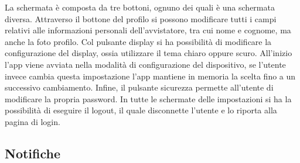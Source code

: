 \documentclass[a4paper,final,12pt]{report}
\begin{document}
La schermata è composta da tre bottoni, ognuno dei quali è una schermata diversa. Attraverso il bottone del profilo si possono modificare tutti i campi relativi alle informazioni personali dell'avvistatore, tra cui nome e cognome, ma anche la foto profilo. Col pulsante display si ha possibilità di modificare la configurazione del display, ossia utilizzare il tema chiaro oppure scuro. All'inizio l'app viene avviata nella modalità di configurazione del dispositivo, se l'utente invece cambia questa impostazione l'app mantiene in memoria la scelta fino a un successivo cambiamento. Infine, il pulsante sicurezza permette all'utente di modificare la propria password. In tutte le schermate delle impostazioni si ha la possibilità di eseguire il logout, il quale disconnette l'utente e lo riporta alla pagina di login.

\subsection{Notifiche}
\end{document}
